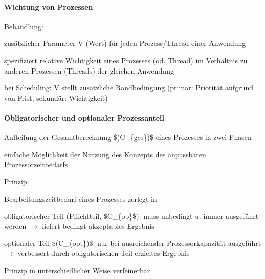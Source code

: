 \documentclass[a4paper]{article}
\begin{document}
\begin{multicols}{3}
    \paragraph{Wichtung von Prozessen}

    Behandlung:

    \begin{itemize*}
        \item
        zusätzlicher Parameter V (Wert) für jeden Prozess/Thread einer
        Anwendung
        \item
        spezifiziert relative Wichtigkeit eines Prozesses (od. Thread) im
        Verhältnis zu anderen Prozessen (Threads) der gleichen Anwendung
        \item
        bei Scheduling: V stellt zusätzliche Randbedingung (primär: Priorität
        aufgrund von Frist, sekundär: Wichtigkeit)
    \end{itemize*}


    \paragraph{Obligatorischer und optionaler
        Prozessanteil}

    \begin{itemize*}
        \item
        Aufteilung der Gesamtberechnung \$(C\_\{ges\})\$ eines Prozesses in
        zwei Phasen
        \item
        einfache Möglichkeit der Nutzung des Konzepts des anpassbaren
        Prozessorzeitbedarfs
        \item
        Prinzip:
        \begin{itemize*}
            \item Bearbeitungszeitbedarf eines Prozesses zerlegt in \begin{enumerate*}  \item   obligatorischer Teil (Pflichtteil, \$C\_\{ob\}\$): muss unbedingt   u. immer ausgeführt werden $\rightarrow$  liefert   bedingt akzeptables Ergebnis \item   optionaler Teil \$(C\_\{opt\})\$: nur bei ausreichender   Prozessorkapazität ausgeführt $\rightarrow$    verbessert durch obligatorischen Teil erzieltes Ergebnis \end{enumerate*}
            \item Prinzip in unterschiedlicher Weise verfeinerbar
        \end{itemize*}
        \item
    \end{itemize*}



\end{multicols}
\end{document}
